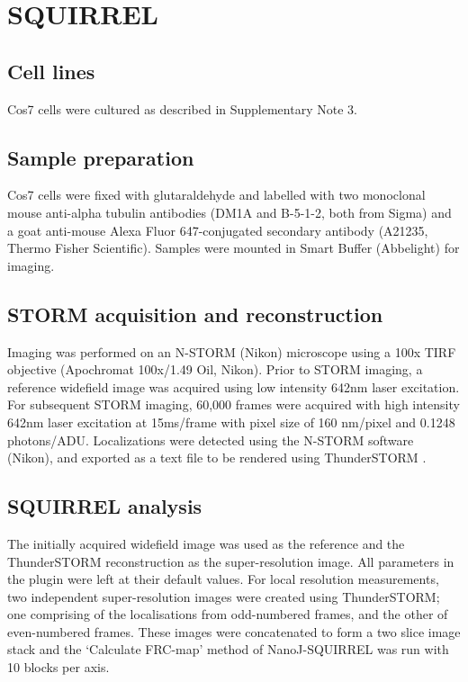 \section{SQUIRREL}

\subsection{Cell lines}
Cos7 cells were cultured as described in Supplementary Note 3.

\subsection{Sample preparation}

Cos7 cells were fixed with glutaraldehyde and labelled with two monoclonal mouse anti-alpha tubulin antibodies (DM1A and B-5-1-2, both from Sigma) and a goat anti-mouse Alexa Fluor 647-conjugated secondary antibody (A21235, Thermo Fisher Scientific). Samples were mounted in Smart Buffer (Abbelight) for imaging.

\subsection{STORM acquisition and reconstruction}

Imaging was performed on an N-STORM (Nikon) microscope using a 100x TIRF objective (Apochromat 100x/1.49 Oil, Nikon). Prior to STORM imaging, a reference widefield image was acquired using low intensity 642nm laser excitation. For subsequent STORM imaging, 60,000 frames were acquired with high intensity 642nm laser excitation at 15ms/frame with pixel size of 160 nm/pixel and 0.1248 photons/ADU. Localizations were detected using the N-STORM software (Nikon), and exported as a text file to be rendered using ThunderSTORM \cite{ovesny2014thunderstorm}.

\subsection{SQUIRREL analysis}

The initially acquired widefield image was used as the reference and the ThunderSTORM reconstruction as the super-resolution image. All parameters in the plugin were left at their default values. For local resolution measurements, two independent super-resolution images were created using ThunderSTORM; one comprising of the localisations from odd-numbered frames, and the other of even-numbered frames. These images were concatenated to form a two slice image stack and the ‘Calculate FRC-map’ method of NanoJ-SQUIRREL was run with 10 blocks per axis.

